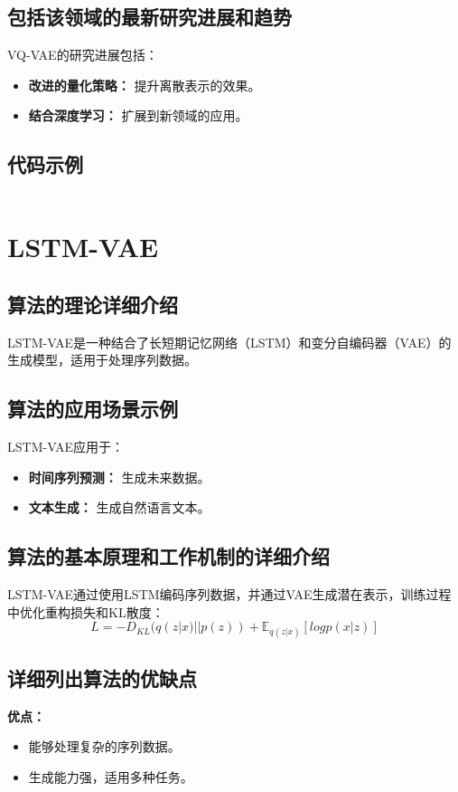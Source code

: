 \subsection*{包括该领域的最新研究进展和趋势}
VQ-VAE的研究进展包括：
\begin{itemize}
    \item \textbf{改进的量化策略：} 提升离散表示的效果。
    \item \textbf{结合深度学习：} 扩展到新领域的应用。
\end{itemize}
\subsection*{代码示例}
\begin{lstlisting}

\end{lstlisting}


\section{LSTM-VAE}
\subsection*{算法的理论详细介绍}
LSTM-VAE是一种结合了长短期记忆网络（LSTM）和变分自编码器（VAE）的生成模型，适用于处理序列数据。

\subsection*{算法的应用场景示例}
LSTM-VAE应用于：
\begin{itemize}
    \item \textbf{时间序列预测：} 生成未来数据。
    \item \textbf{文本生成：} 生成自然语言文本。
\end{itemize}

\subsection*{算法的基本原理和工作机制的详细介绍}
LSTM-VAE通过使用LSTM编码序列数据，并通过VAE生成潜在表示，训练过程中优化重构损失和KL散度：
\[
    L = -D_{KL}(q(z|x)||p(z)) + \mathbb{E}_{q(z|x)}[log p(x|z)]
\]

\subsection*{详细列出算法的优缺点}
\textbf{优点：}
\begin{itemize}
    \item 能够处理复杂的序列数据。
    \item 生成能力强，适用多种任务。
\end{itemize}

